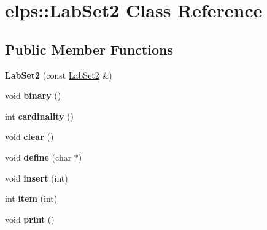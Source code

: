 \hypertarget{classelps_1_1_lab_set2}{\section{elps\+:\+:Lab\+Set2 Class Reference}
\label{classelps_1_1_lab_set2}
}
\subsection*{Public Member Functions}
\begin{DoxyCompactItemize}
\item 
\hypertarget{classelps_1_1_lab_set2_ae471376aa19d802afa471cb0026e07e0}{{\bfseries Lab\+Set2} (const \hyperlink{classelps_1_1_lab_set2}{Lab\+Set2} \&)}\label{classelps_1_1_lab_set2_ae471376aa19d802afa471cb0026e07e0}

\item 
\hypertarget{classelps_1_1_lab_set2_a738ce9296f559d94eb6e43263bcba300}{void {\bfseries binary} ()}\label{classelps_1_1_lab_set2_a738ce9296f559d94eb6e43263bcba300}

\item 
\hypertarget{classelps_1_1_lab_set2_a426c257b067c4d556da1519d0c5ce53f}{int {\bfseries cardinality} ()}\label{classelps_1_1_lab_set2_a426c257b067c4d556da1519d0c5ce53f}

\item 
\hypertarget{classelps_1_1_lab_set2_aaf231a698cd6d635b71f3edc36bf615c}{void {\bfseries clear} ()}\label{classelps_1_1_lab_set2_aaf231a698cd6d635b71f3edc36bf615c}

\item 
\hypertarget{classelps_1_1_lab_set2_a1e8a1e457b9cbf626d5e14c491123b02}{void {\bfseries define} (char $\ast$)}\label{classelps_1_1_lab_set2_a1e8a1e457b9cbf626d5e14c491123b02}

\item 
\hypertarget{classelps_1_1_lab_set2_aa77d293975b365339a2931c8eb3e47cb}{void {\bfseries insert} (int)}\label{classelps_1_1_lab_set2_aa77d293975b365339a2931c8eb3e47cb}

\item 
\hypertarget{classelps_1_1_lab_set2_a22bb966481d0a06cceae30d09902f2d7}{int {\bfseries item} (int)}\label{classelps_1_1_lab_set2_a22bb966481d0a06cceae30d09902f2d7}

\item 
\hypertarget{classelps_1_1_lab_set2_a978b66027f219f7f506d749da79dd327}{void {\bfseries print} ()}\label{classelps_1_1_lab_set2_a978b66027f219f7f506d749da79dd327}


\end{DoxyCompactItemize}
